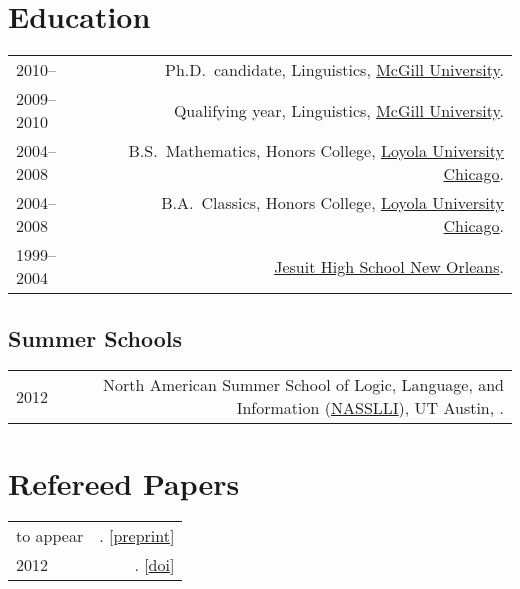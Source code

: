 \documentclass[letterpaper]{article}
\makeatletter
\newcommand{\formatdatenoday}[2]{%
  \mydatenoday
  \formatdate{0}{#1}{#2}
}
\newcommand{\myvrule}{\color{lightgray}\vrule width 1.0pt}
\newenvironment{cvsection}{%
  \vspace{-3ex}
  \renewcommand{\arraystretch}{1.5}
  \begin{longtable}{@{} L R @{}}
}{%
  \end{longtable}
  \vspace{1ex}
  \renewcommand{\arraystretch}{1.0}
}
\makeatother
\begin{document}

\section*{Education}

\begin{cvsection}
  2010-- & Ph.D.~candidate, Linguistics, \href{http://www.mcgill.ca/}{McGill
  University}. \\

  2009--2010 & Qualifying year, Linguistics,
  \href{http://www.mcgill.ca/}{McGill University}. \\

  2004--2008 & B.S.~Mathematics, Honors College,
  \href{http://www.luc.edu/}{Loyola University Chicago}. \\

  2004--2008 & B.A.~Classics, Honors College, \href{http://www.luc.edu/}{Loyola
  University Chicago}. \\

  1999--2004 & \href{http://www.jesuitnola.org/about/aboutindex.htm}{Jesuit
  High School New Orleans}.
\end{cvsection}

\subsection*{Summer Schools}

\begin{cvsection}
  2012 & North American Summer School of Logic, Language, and Information
  (\href{http://nasslli2012.com/}{NASSLLI}), UT Austin,
  \formatdatenoday{6}{2012}.
\end{cvsection}



\section*{Refereed Papers}

\begin{cvsection}
  {\small to appear} & \hspace{0pt}.
  [\href{http://people.linguistics.mcgill.ca/~brian.buccola/files/buccola-fg2013.pdf}{preprint}]
  \\
  2012 & \hspace{0pt}.
  [\href{http://dx.doi.org/10.3765/sp}{doi}]
\end{cvsection}
\end{document}
